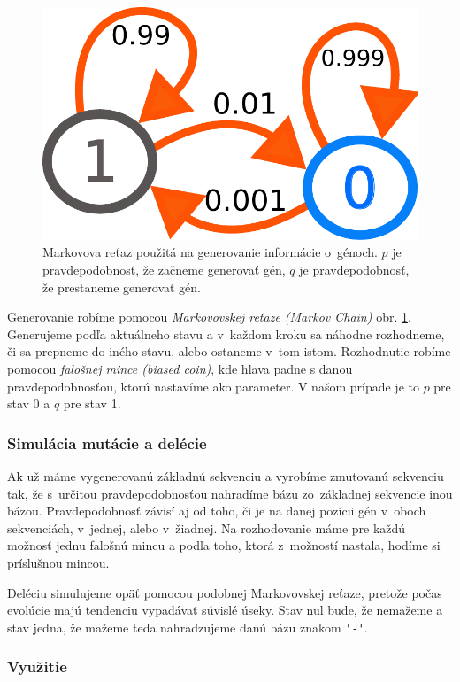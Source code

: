 \begin{figure}[htp]
    \centering
    \includegraphics[width=.7\textwidth]{images/markov_chain}
    \caption{Markovova reťaz použitá na generovanie informácie o~génoch. $p$ je pravdepodobnosť, že začneme generovať gén, $q$ je pravdepodobnosť, že prestaneme generovať gén.}
    \label{fig:markov-chain}
\end{figure}

Generovanie robíme pomocou \textit{Markovovskej reťaze (Markov Chain)} obr. \ref{fig:markov-chain}. Generujeme podľa aktuálneho stavu a v~každom kroku sa náhodne rozhodneme, či sa prepneme do iného stavu, alebo ostaneme v~tom istom. Rozhodnutie robíme pomocou \textit{falošnej mince (biased coin)}, kde hlava padne s danou pravdepodobnosťou, ktorú nastavíme ako parameter. V našom prípade je to $p$ pre stav 0 a $q$ pre stav 1.


\subsubsection{Simulácia mutácie a delécie}

Ak už máme vygenerovanú základnú sekvenciu a vyrobíme zmutovanú sekvenciu tak, že s~určitou pravdepodobnosťou nahradíme bázu zo~základnej sekvencie inou bázou. Pravdepodobnosť závisí aj od toho, či je na danej pozícii gén v~oboch sekvenciách, v~jednej, alebo v~žiadnej. Na rozhodovanie máme pre každú možnosť jednu falošnú mincu a podľa toho, ktorá z~možností nastala, hodíme si príslušnou mincou.

Deléciu simulujeme opäť pomocou podobnej Markovovskej reťaze, pretože počas evolúcie majú tendenciu vypadávať súvislé úseky. Stav nul bude, že nemažeme a stav jedna, že mažeme teda nahradzujeme danú bázu znakom {\verb+'-'+}.

\subsubsection{Využitie}

